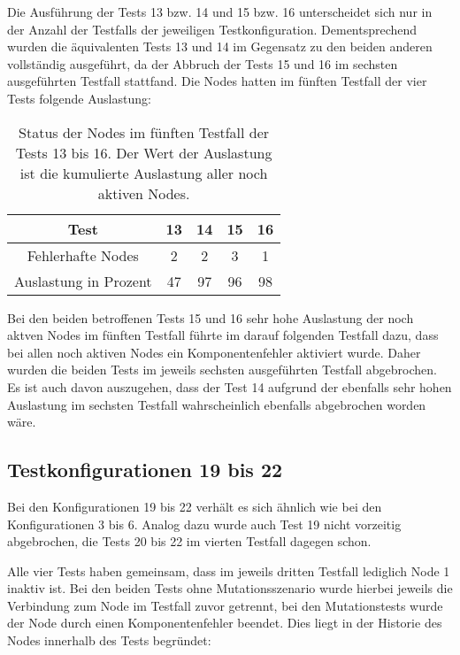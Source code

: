 Die Ausführung der \glspl{Test} 13 bzw. 14 und 15 bzw. 16 unterscheidet sich nur in der Anzahl der \glspl{Testfall} der jeweiligen Testkonfiguration.
Dementsprechend wurden die äquivalenten \glspl{Test} 13 und 14 im Gegensatz zu den beiden anderen vollständig ausgeführt, da der Abbruch der \glspl{Test} 15 und 16 im sechsten ausgeführten \gls{Testfall} stattfand.
Die Nodes hatten im fünften \gls{Testfall} der vier \glspl{Test} folgende Auslastung:

\begin{table}[h]
    \begin{tabular}{c|cccc}
    	        \gls{Test}          & 13 & 14 & 15 & 16 \\ \hline
    	  Fehlerhafte Nodes   & 2  & 2  & 3  & 1  \\
    	Auslastung in Prozent & 47 & 97 & 96 & 98
    \end{tabular}
    \caption[Status der Nodes im fünften \gls{Testfall} der \glspl{Test} 13 bis 16]
        {Status der Nodes im fünften \gls{Testfall} der \glspl{Test} 13 bis 16.
        Der Wert der Auslastung ist die kumulierte Auslastung aller noch aktiven Nodes.}
    \label{tab:loadTests1316}
\end{table}

Bei den beiden betroffenen \glspl{Test} 15 und 16 sehr hohe Auslastung der noch aktven Nodes im fünften \gls{Testfall} führte im darauf folgenden \gls{Testfall} dazu, dass bei allen noch aktiven Nodes ein Komponentenfehler aktiviert wurde.
Daher wurden die beiden \glspl{Test} im jeweils sechsten ausgeführten \gls{Testfall} abgebrochen.
Es ist auch davon auszugehen, dass der \gls{Test} 14 aufgrund der ebenfalls sehr hohen Auslastung im sechsten \gls{Testfall} wahrscheinlich ebenfalls abgebrochen worden wäre.

\subsection{Testkonfigurationen 19 bis 22}
\label{subsec:noReconf1922}

Bei den Konfigurationen 19 bis 22 verhält es sich ähnlich wie bei den Konfigurationen 3 bis 6.
Analog dazu wurde auch \gls{Test} 19 nicht vorzeitig abgebrochen, die \glspl{Test} 20 bis 22 im vierten \gls{Testfall} dagegen schon.

Alle vier \glspl{Test} haben gemeinsam, dass im jeweils dritten \gls{Testfall} lediglich Node 1 inaktiv ist.
Bei den beiden \glspl{Test} ohne Mutationsszenario wurde hierbei jeweils die Verbindung zum Node im \gls{Testfall} zuvor getrennt, bei den Mutationstests wurde der Node durch einen Komponentenfehler beendet.
Dies liegt in der Historie des Nodes innerhalb des \glspl{Test} begründet:

